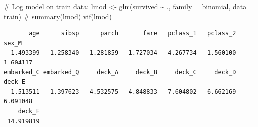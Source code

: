 \documentclass[
  letterpaper,
  DIV=11,
  numbers=noendperiod]{scrartcl}
\newenvironment{Shaded}{\begin{snugshade}}{\end{snugshade}}
\newcommand{\AttributeTok}[1]{\textcolor[rgb]{0.40,0.45,0.13}{#1}}
\newcommand{\CommentTok}[1]{\textcolor[rgb]{0.37,0.37,0.37}{#1}}
\newcommand{\FunctionTok}[1]{\textcolor[rgb]{0.28,0.35,0.67}{#1}}
\newcommand{\NormalTok}[1]{\textcolor[rgb]{0.00,0.23,0.31}{#1}}
\newcommand{\OtherTok}[1]{\textcolor[rgb]{0.00,0.23,0.31}{#1}}
\newcommand{\SpecialCharTok}[1]{\textcolor[rgb]{0.37,0.37,0.37}{#1}}
\begin{document}
\begin{Shaded}
\begin{Highlighting}[]
\CommentTok{\# Log model on train data:}
\NormalTok{lmod }\OtherTok{\textless{}{-}} \FunctionTok{glm}\NormalTok{(survived }\SpecialCharTok{\textasciitilde{}}\NormalTok{ ., }\AttributeTok{family =}\NormalTok{ binomial, }\AttributeTok{data =}\NormalTok{ train)}
\CommentTok{\# summary(lmod)}
\FunctionTok{vif}\NormalTok{(lmod)}
\end{Highlighting}
\end{Shaded}

\begin{verbatim}
       age      sibsp      parch       fare   pclass_1   pclass_2      sex_M 
  1.493399   1.258340   1.281859   1.727034   4.267734   1.560100   1.604117 
embarked_C embarked_Q     deck_A     deck_B     deck_C     deck_D     deck_E 
  1.513511   1.397623   4.532575   4.848833   7.604802   6.662169   6.091048 
    deck_F 
 14.919819 
\end{verbatim}
\end{document}
